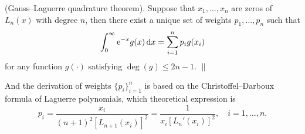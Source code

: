 \begin{theorem}{\rm \textsf{(Gauss--Laguerre quadrature theorem).} Suppose that $x_1, \dots, x_n$ are zeros of $L_n(x)$ with degree $n$, then there exist a unique set of weights $p_1, \dots, p_n$ such that
$$
    \int_0^\infty {\rm e}^{-x} g(x) \,\mbox{d} x = \sum_{i=1}^n p_i g(x_i)
$$
for any function $g(\cdot)$ satisfying $\deg(g) \le 2n - 1$. \hfill$\|$
}\end{theorem}
And the derivation of weights $\{p_i\}_{i=1}^n$ is based on the Christoffel--Darboux formula of Laguerre polynomials, which theoretical expression is
$$
    p_i = \frac{x_i}{(n + 1)^2 [L_{n+1}(x_i)]^2} = \frac{1}{x_i [L_n'(x_i)]^2}, \quad i = 1, \dots, n.
$$